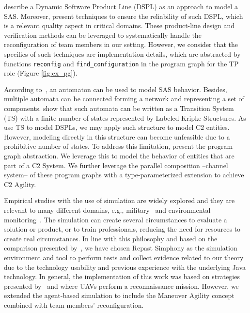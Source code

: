 \citet{Rosenmuller2011} describe a Dynamic Software Product Line (DSPL) as an approach to model a SAS.
Moreover, \citet{BSN-DSPL} present techniques to ensure the reliability of such DSPL, which is a relevant quality aspect in critical domains.
These product-line design and verification methods can be leveraged to systematically handle the reconfiguration of team members in our setting.
However, we consider that the specifics of such techniques are implementation details, which are abstracted by functions \texttt{reconfig} and \texttt{find\_configuration} in the program graph for the TP role (Figure \ref{fig:ex_pg}).


According to~\citet{Rutten2017}, an automaton can be used to model SAS behavior. Besides, multiple automata can be connected forming a network and representing a set of components. \citet{MC01} show that such automata can be written as a Transition System (TS) with a finite number of states represented by Labeled Kripke Structures. As \citet{ltl02} use TS to model DSPLs, we may apply such structure to model C2 entities. However, modeling directly in this structure can become unfeasible due to a prohibitive number of states. To address this limitation, \citet{MC01} present the program graph abstraction.   We leverage this to model the behavior of entities that are part of a C2 System. We further leverage the parallel composition --channel system-- of these program graphs with a type-parameterized extension to achieve C2 Agility. 



Empirical studies with the use of simulation are widely explored and they are relevant to many different domains, e.g., military~\citep{CC03} and environmental monitoring~\citep{simulation001}. The simulation can create several circumstances to evaluate a solution or product, or to train professionals, reducing the need for resources to create real circumstances. In line with this philosophy and based on the comparison presented by~\citet{SIMUL01}, we have chosen Repast Simphony as the simulation environment and tool to perform tests and collect evidence related to our theory due to the technology usability and previous experience with the underlying Java technology. In general, the implementation of this work was based on strategies presented by~\citet{MAS07} and \citet{UAV01} where UAVs perform a reconnaissance mission. However, we extended the agent-based simulation to include the Maneuver Agility concept combined with team members' reconfiguration.

